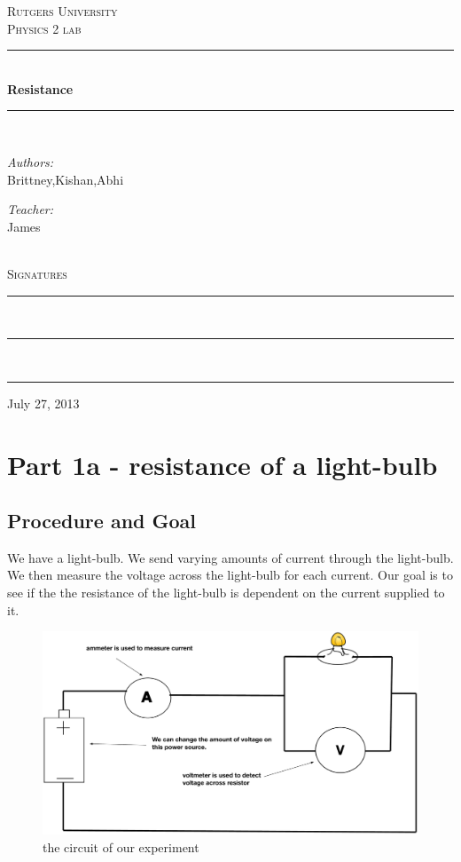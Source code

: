 \documentclass[12pt]{article}
\begin{document}
\begin{titlepage}
\begin{center}
	\textsc{\LARGE Rutgers University}\\[1.5 cm]
    \textsc{\Large Physics 2 lab}\\[0.5cm]
    \rule{\linewidth}{0.5mm} \\ [.4 cm]
    {\huge \bfseries Resistance}\\[.4 cm]
    \rule{\linewidth}{0.5mm} \\ [1.5 cm]
    \begin{minipage}{0.4\textwidth}
	\begin{flushleft} \large
	\emph{Authors:}\\
	Brittney,Kishan,Abhi
	\end{flushleft}
	\end{minipage}
	\begin{minipage}{0.4\textwidth}
	\begin{flushright} \large
	\emph{Teacher:} \\
	James
	\end{flushright}
	\end{minipage}\\[2 cm]
	\textsc{ \Large Signatures} \\[1.7 cm] 
	\rule{10 cm}{0.5mm} \\ [2.0 cm]
	\rule{10 cm}{0.5mm} \\ [2.0 cm]
	\rule{10 cm}{0.5mm}
	\vfill
	{\large {July 27, 2013}}
\end{center}
\end{titlepage}

\section*{Part 1a - resistance of a light-bulb}
\subsection*{Procedure and Goal}
 We have a light-bulb. We send varying amounts of current through the light-bulb. We then measure the voltage across the light-bulb for each current. Our goal is to see if the the resistance of the light-bulb is dependent on the current supplied to it. 

 \begin{figure}[h]
	 \centering
	 \includegraphics[scale = .35]{figOne}
	 \caption{the circuit of our experiment}
  \end{figure}
\end{document}
